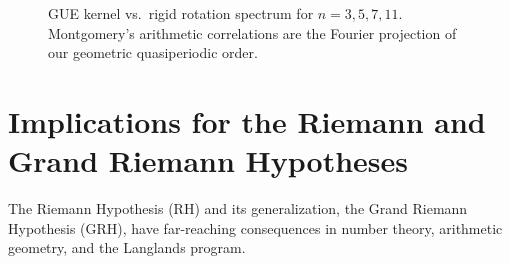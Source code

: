 \documentclass[11pt,a4paper]{article}
\begin{document}
\begin{figure}[ht]
\caption{GUE kernel vs.\ rigid rotation spectrum for $n=3,5,7,11$. Montgomery's arithmetic correlations are the Fourier projection of our geometric quasiperiodic order.}
\label{fig:gue-vs-rotation-n3-n5-n7-n11}
\end{figure}

\section{Implications for the Riemann and Grand Riemann Hypotheses}
\label{subsec:rh-grh-implications}

The Riemann Hypothesis (RH) and its generalization, the Grand Riemann Hypothesis (GRH), have far-reaching consequences in number theory, arithmetic geometry, and the Langlands program.
\end{document}
